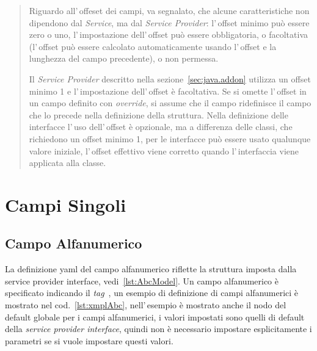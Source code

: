 \documentclass[a4paper,10pt]{report}
\begin{document}
\begin{quote}
Riguardo all'\,offeset dei campi, va segnalato, che alcune caratteristiche non 
dipendono dal \textsl{Service}, ma dal \textsl{Service Provider}:
l'\,offset minimo può essere zero o uno, l'\,impostazione dell'\,offset può
essere obbligatoria, o facoltativa (l'\,offset può essere calcolato 
automaticamente usando l'\,offset e la lunghezza del campo precedente), 
o non permessa.

Il \textsl{Service Provider} descritto nella sezione~\ref{sec:java.addon}
utilizza un offset minimo 1 e l'\,impostazione dell'\,offset è facoltativa.
Se si omette l'\,offset in un campo definito con \textsl{override}, si assume 
che  il campo ridefinisce il campo che lo precede nella definizione della 
struttura.
Nella definizione delle interfacce l'\,uso dell'\,offset è opzionale, ma a 
differenza delle classi, che richiedono un offset minimo 1, per le interfacce
può essere usato qualunque valore iniziale, l'\,offset effettivo viene corretto
quando l'\,interfaccia viene applicata alla classe.
\end{quote}


\section{Campi Singoli}

\subsection{Campo Alfanumerico} \label{sub:yaml.abc}
La definizione yaml del campo alfanumerico riflette la struttura imposta dalla
service provider interface, vedi~\ref{lst:AbcModel}.
Un campo alfanumerico è specificato indicando il \textsl{tag} 
\,, 
un esempio di definizione di campi alfanumerici è mostrato nel 
cod.~\ref{lst:xmplAbc}, nell'\,esempio è mostrato anche il nodo del default
globale per i campi alfanumerici, i valori impostati sono quelli di default
della \textsl{service provider interface}, quindi non è necessario impostare
esplicitamente i parametri se si vuole impostare questi valori.
\end{document}

